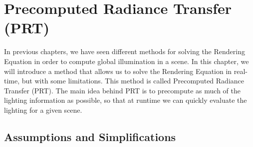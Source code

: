 \chapter{Precomputed Radiance Transfer (PRT)}

In previous chapters, we have seen different methods for solving the Rendering Equation in order to compute global illumination in a scene. In this chapter, we will introduce a method that allows us to solve the Rendering Equation in real-time, but with some limitations. This method is called Precomputed Radiance Transfer (PRT). The main idea behind PRT is to precompute as much of the lighting information as possible, so that at runtime we can quickly evaluate the lighting for a given scene.

\section{Assumptions and Simplifications}

